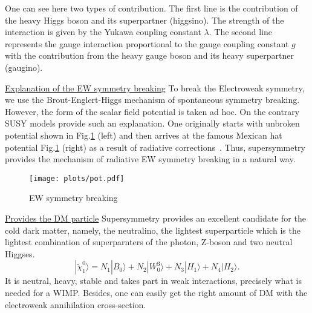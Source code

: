 \documentclass{cernyrep}
\begin{document}
One can see here two types of contribution. The first line is
the contribution of the heavy Higgs boson and its superpartner
(higgsino). The strength of the interaction is given by the
Yukawa coupling constant $\lambda$. The second line represents
the gauge interaction proportional to the gauge coupling
constant $g$ with the contribution from the heavy gauge boson
and its heavy superpartner (gaugino).

\underline{Explanation of the EW symmetry breaking}
To break the Electroweak symmetry, we use the Brout-Englert-Higgs mechanism
of spontaneous symmetry breaking. However, the form of the scalar field potential
is taken ad hoc. On the contrary SUSY models provide
such an explanation. One originally starts with  unbroken potential
shown in Fig.\ref{potential} (left) 
and then arrives at the famous Mexican hat potential Fig.\ref{potential} (right)
as a result of radiative corrections~\cite{RC}. Thus, supersymmetry provides the mechanism of radiative EW symmetry breaking in a natural way. 
\begin{figure}[htb]
\begin{center}
\leavevmode
\texttt{[image: plots/pot.pdf]}
\end{center}
\vspace{-6mm}
\caption{EW symmetry breaking}
\label{potential}
\end{figure}

\underline{Provides the DM particle}
Supersymmetry provides an excellent candidate
for the cold dark matter, namely, the neutralino, the
lightest superparticle which is the lightest combination of 
superparnters of the photon, Z-boson and two neutral Higgses.
$$
|\tilde \chi^0_1\rangle =N_1|B_0\rangle
+N_2|W^3_0\rangle +N_3|H_1\rangle +N_4|H_2\rangle.
$$
It is neutral, heavy, stable
and takes part in weak interactions, precisely what is needed
for a WIMP. Besides, one can easily get the right amount of DM
with the electroweak annihilation cross-section.


\end{document}
